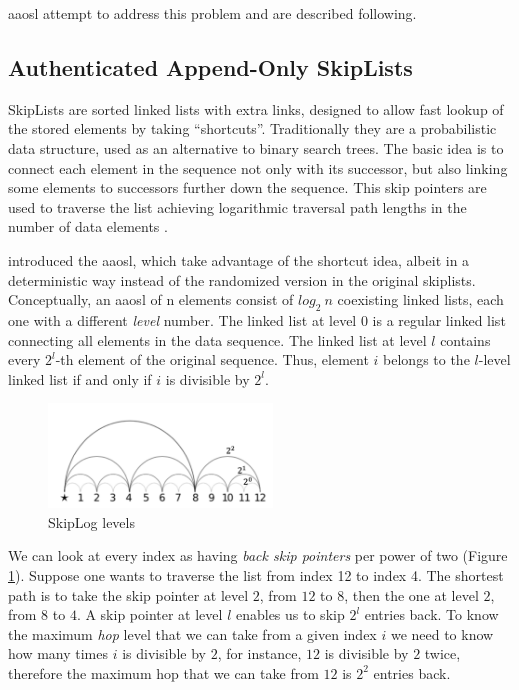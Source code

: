 \gls{aaosl} attempt to address this problem and are described following.

\subsection{Authenticated Append-Only SkipLists}
SkipLists  are sorted linked lists with extra links, designed to allow fast lookup of the stored elements by taking ``shortcuts''. Traditionally they are a probabilistic data structure, used as an alternative to binary search trees. The basic idea is to connect each element in the sequence not only with its successor, but also linking some elements to successors further down the sequence. This skip pointers are used to traverse the list achieving logarithmic traversal path lengths in the number of data elements \citep{pugh}.

\cite{skiplist} introduced the \gls{aaosl}, which take advantage of the shortcut idea, albeit in a deterministic way instead of the randomized version in the original skiplists. Conceptually, an \gls{aaosl} of n elements consist of $log_2\ n$ coexisting linked lists, each one with a different \textit{level} number. The linked list at level $0$ is a regular linked list connecting all elements in the data sequence. The linked list at level $l$ contains every $2^l$-th element of the original sequence. Thus, element $i$ belongs to the $l$-level linked list if and only if $i$ is divisible by $2^l$.


\begin{figure}[h]
    \centering
    \includegraphics[width=0.53\textwidth]{img/skiplist1.png}
    \caption{SkipLog levels}
    \label{fig:levels}
\end{figure}

We can look at every index as having \textit{back skip pointers} per power of two (Figure \ref{fig:levels}). Suppose one wants to traverse the list from index 12 to index 4. The shortest path is to take the skip pointer at level $2$, from $12$ to $8$, then the one at level $2$, from $8$ to $4$. A skip pointer at level $l$ enables us to skip $2^l$ entries back. To know the maximum \textit{hop} level that we can take from a given index $i$ we need to know how many times $i$ is divisible by $2$, for instance, $12$ is divisible by $2$ twice, therefore the maximum hop that we can take from $12$ is $2^2$ entries back. 

